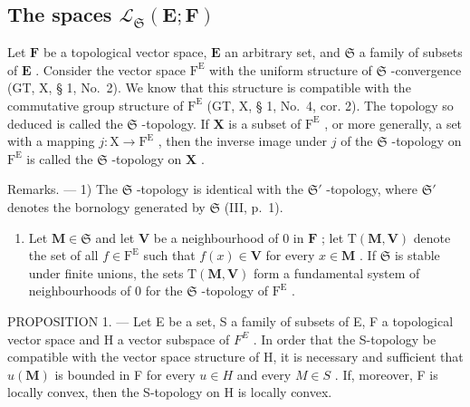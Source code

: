 \subsection{\texorpdfstring{The spaces \(\mathcal{L}_{\mathfrak{S}}(\mathbf{E};\mathbf{F})\)}{The spaces \textbackslash mathcal\{L\}\_\{\textbackslash mathfrak\{S\}\}(\textbackslash mathbf\{E\};\textbackslash mathbf\{F\})}}

Let \(\mathbf{F}\) be a topological vector space, \(\mathbf{E}\) an arbitrary set, and \(\mathfrak{S}\) a family of subsets of \(\mathbf{E}\) . Consider the vector space \(\mathrm{F}^{\mathrm{E}}\) with the uniform structure of \(\mathfrak{S}\) -convergence (GT, X, § 1, No.~2). We know that this structure is compatible with the commutative group structure of \(\mathrm{F}^{\mathrm{E}}\) (GT, X, § 1, No.~4, cor. 2). The topology so deduced is called the \(\mathfrak{S}\) -topology. If \(\mathbf{X}\) is a subset of \(\mathrm{F}^{\mathrm{E}}\) , or more generally, a set with a mapping \(j: \mathrm{X} \to \mathrm{F}^{\mathrm{E}}\) , then the inverse image under \(j\) of the \(\mathfrak{S}\) -topology on \(\mathrm{F}^{\mathrm{E}}\) is called the \(\mathfrak{S}\) -topology on \(\mathbf{X}\) .

Remarks. --- 1) The \(\mathfrak{S}\) -topology is identical with the \(\mathfrak{S}'\) -topology, where \(\mathfrak{S}'\) denotes the bornology generated by \(\mathfrak{S}\) (III, p.~1).

\begin{enumerate}
\def\labelenumi{\arabic{enumi})}
\setcounter{enumi}{1}
\tightlist
\item
  Let \(\mathbf{M} \in \mathfrak{S}\) and let \(\mathbf{V}\) be a neighbourhood of 0 in \(\mathbf{F}\) ; let \(\mathrm{T}(\mathbf{M}, \mathbf{V})\) denote the set of all \(f \in \mathrm{F}^{\mathrm{E}}\) such that \(f(x) \in \mathbf{V}\) for every \(x \in \mathbf{M}\) . If \(\mathfrak{S}\) is stable under finite unions, the sets \(\mathrm{T}(\mathbf{M}, \mathbf{V})\) form a fundamental system of neighbourhoods of 0 for the \(\mathfrak{S}\) -topology of \(\mathrm{F}^{\mathrm{E}}\) .
\end{enumerate}

PROPOSITION 1. --- Let E be a set, S a family of subsets of E, F a topological vector space and H a vector subspace of \(F^{E}\) . In order that the S-topology be compatible with the vector space structure of H, it is necessary and sufficient that \(u(\mathbf{M})\) is bounded in F for every \(u \in H\) and every \(M \in S\) . If, moreover, F is locally convex, then the S-topology on H is locally convex.


